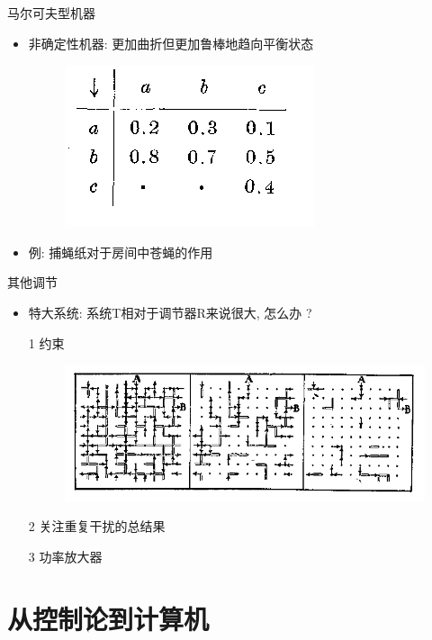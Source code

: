 \documentclass[12pt,AutoFakeBold,aspectratio=43,mathserif]{beamer}
\begin{document}
    \begin{frame}{马尔可夫型机器}
        \begin{itemize}
                \item 非确定性机器: 更加曲折但更加鲁棒地趋向平衡状态
                \begin{figure}[H]
                \centering
                \includegraphics[width=.6\textwidth]{figures/pic3.png}
                \end{figure}
                \item 例: 捕蝇纸对于房间中苍蝇的作用
        \end{itemize}
        
    \end{frame}
      
    \begin{frame}{其他调节}
        \begin{itemize}
                \item 特大系统: 系统T相对于调节器R来说很大, 怎么办 ?
                \item[1] 约束
                \begin{figure}[H]
                \centering
                \includegraphics[width=.6\textwidth]{figures/pic4.png}
                \end{figure}
                \item[2] 关注重复干扰的总结果
                \item[3] 功率放大器
        \end{itemize}
    \end{frame}

    \section{从控制论到计算机}
\end{document}
